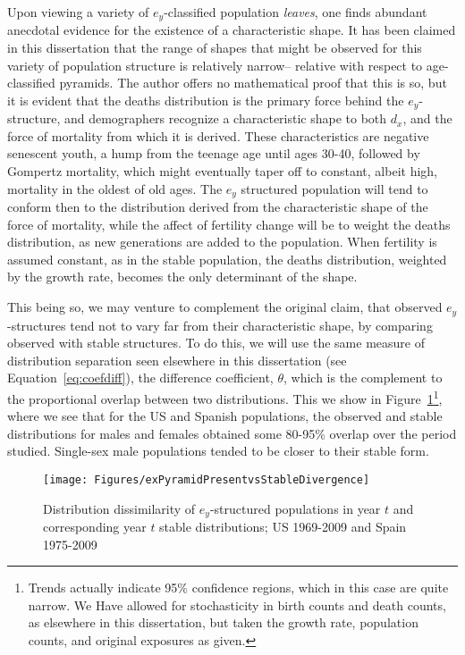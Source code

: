  \FloatBarrier
Upon viewing a variety of $e_y$-classified population \textit{leaves}, one finds
abundant anecdotal evidence for the existence of a characteristic shape. It has
been claimed in this dissertation that the range of shapes that might be
observed for this variety of population structure is relatively narrow--
relative with respect to age-classified pyramids. The author offers no
mathematical proof that this is so, but it is evident that the deaths
distribution is the primary force behind the $e_y$-structure, and demographers
recognize a characteristic shape to both $d_x$, and the force of mortality from
which it is derived. These characteristics are negative senescent youth, a hump
from the teenage age until ages 30-40, followed by Gompertz mortality, which
might eventually taper off to constant, albeit high, mortality in the oldest of
old ages\citep{horiuchi1998deceleration, vaupel1997trajectories}. The $e_y$
structured population will tend to conform then to the distribution derived from 
the characteristic shape of the force of mortality,
while the affect of fertility change will be to weight the deaths distribution,
as new generations are added to the population. When fertility is assumed
constant, as in the stable population, the deaths distribution, weighted by 
the growth rate, becomes the only determinant of the shape. 

This being so, we may venture to complement the original claim, that observed
$e_y$-structures tend not to vary far from their characteristic shape, by
comparing observed with stable structures. To do this, we will use the same 
measure of distribution separation seen elsewhere in this dissertation (see
Equation~\eqref{eq:coefdiff}), the difference coefficient, $\theta$, which is
the complement to the proportional overlap between two distributions. This we show in
Figure~\ref{fig:exstablepyr}\footnote{Trends actually indicate 95\% confidence
regions, which in this case are quite narrow. We Have allowed for
stochasticity in birth counts and death counts, as elsewhere in this
dissertation, but taken the growth rate, population counts, and original
exposures as given.}, where we see that for the US and Spanish populations, the
observed and stable distributions for males and females obtained some 80-95\%
overlap over the period studied. Single-sex male populations tended to be closer
to their stable form.

\begin{figure}[ht!]
       \centering
       \caption{Distribution dissimilarity of $e_y$-structured populations in
       year $t$ and corresponding year $t$ stable distributions; US 1969-2009
       and Spain 1975-2009}
        \texttt{[image: Figures/exPyramidPresentvsStableDivergence]}
        \label{fig:exstablepyr}
\end{figure}

